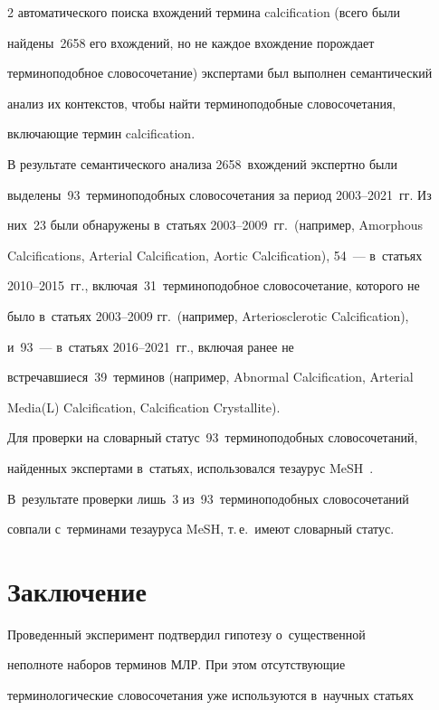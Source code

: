 \begin{multicols}{2}
автоматического поиска вхождений термина calcification (всего были 

найде\-ны~2658 его вхождений, но не каждое вхождение порождает 

терминоподобное словосочетание) экспертами был выполнен семантический 

анализ их контекстов, чтобы найти терминоподобные словосочетания, 

включающие термин calcification.

  

  В результате семантического анализа 2658~вхож\-де\-ний экспертно были 

выделены~93~терминоподобных словосочетания за период 2003--2021~гг. Из 

них~23 были обнаружены в~статьях 2003--2009~гг.\ (например, Amorphous 

Calcifications, Arterial Calcification, Aortic Calcification), 54~--- в~статьях  

2010--2015~гг., включая~31~терминоподобное словосочетание, которого не 

было в~стать\-ях 2003--2009 гг.\ (например, Arteriosclerotic Calcification),  

и~93~--- в~стать\-ях 2016--2021~гг., включая ранее не 

встре\-чав\-ши\-еся~39~терминов (например, Abnormal Calcification, Arterial 

Media(L) Calcification, Calcification Crystallite).

  

  Для проверки на словарный статус~93~терминоподобных словосочетаний, 

найденных экспертами в~статьях, использовался тезаурус MeSH~\cite{1-zz}. 

В~результате проверки лишь~3 из~93~терминоподобных словосочетаний 

совпали с~терминами тезауруса MeSH, т.\,е.\ имеют словарный статус.



\section{Заключение}



  Проведенный эксперимент подтвердил гипотезу о~существенной 

неполноте наборов терминов МЛР. При этом отсутствующие 

терминологические словосочетания уже используются в~научных стать\-ях 


\end{multicols}
